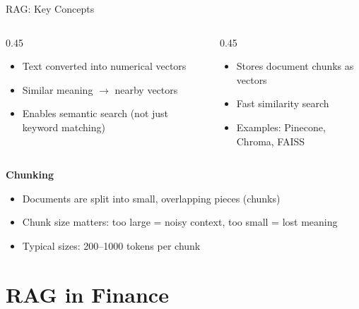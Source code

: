 \documentclass[aspectratio=169]{beamer}
\begin{document}
\begin{frame}[shrink=5]{RAG: Key Concepts}
\begin{columns}[T]
\begin{column}{0.45\textwidth}
\begin{shadedbox}[title=\textbf{Embeddings}]
\begin{itemize}\small
  \item Text converted into numerical vectors
  \item Similar meaning $\rightarrow$ nearby vectors
  \item Enables semantic search (not just keyword matching)
\end{itemize}
\end{shadedbox}
\end{column}
\begin{column}{0.45\textwidth}
\begin{shadedbox}[title=\textbf{Vector Database}]
\begin{itemize}\small
  \item Stores document chunks as vectors
  \item Fast similarity search
  \item Examples: Pinecone, Chroma, FAISS
\end{itemize}
\end{shadedbox}
\end{column}
\end{columns}
\vspace{0.3cm}
\textbf{Chunking}
\begin{itemize}\small
  \item Documents are split into small, overlapping pieces (chunks)
  \item Chunk size matters: too large = noisy context, too small = lost meaning
  \item Typical sizes: 200--1000 tokens per chunk
\end{itemize}
\end{frame}

\section{RAG in Finance}
\end{document}
